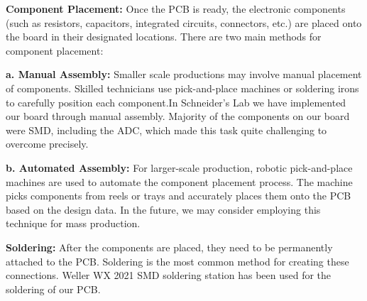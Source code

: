 \textbf{Component Placement:}  
Once the PCB is ready, the electronic components (such as resistors, capacitors, integrated circuits, connectors, etc.) are placed onto the board in their designated locations. There are two main methods for component placement:
\par
\textbf{a. Manual Assembly:}  
 Smaller scale productions may involve manual placement of components. Skilled technicians use pick-and-place machines or soldering irons to carefully position each component.In Schneider's Lab we have implemented our board through manual assembly. Majority of the components on our board were SMD, including the ADC, which made this task quite challenging to overcome precisely.
\par
\textbf{b. Automated Assembly:}  
 For larger-scale production, robotic pick-and-place machines are used to automate the component placement process. The machine picks components from reels or trays and accurately places them onto the PCB based on the design data. In the future, we may consider employing this technique for mass production.
\par
\textbf{Soldering: }  
After the components are placed, they need to be permanently attached to the PCB. Soldering is the most common method for creating these connections. Weller WX 2021 SMD soldering station has been used for the soldering of our PCB.
\par
